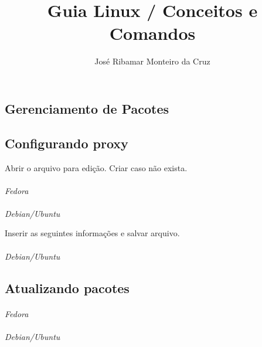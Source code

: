 \documentclass[a4paper,9pt]{extarticle}
\begin{document}
\title{Guia Linux / Conceitos e Comandos}
\author{José Ribamar Monteiro da Cruz}
\maketitle
\tableofcontents



\begin{multicols}{2}
\section{Gerenciamento de Pacotes}
\subsection{Configurando proxy}
	Abrir o arquivo para edição. Criar caso não exista.
	
	\paragraph{} \emph{Fedora}
	
	\paragraph{} \emph{Debian/Ubuntu} \newline
	
	\noindent Inserir as seguintes informações e salvar arquivo.
	
	\paragraph{} \emph{Debian/Ubuntu}
	
	
\subsection{Atualizando pacotes}
	
	\paragraph{} \emph{Fedora}
	
	\paragraph{} \emph{Debian/Ubuntu}
	

\end{multicols}
\end{document}
